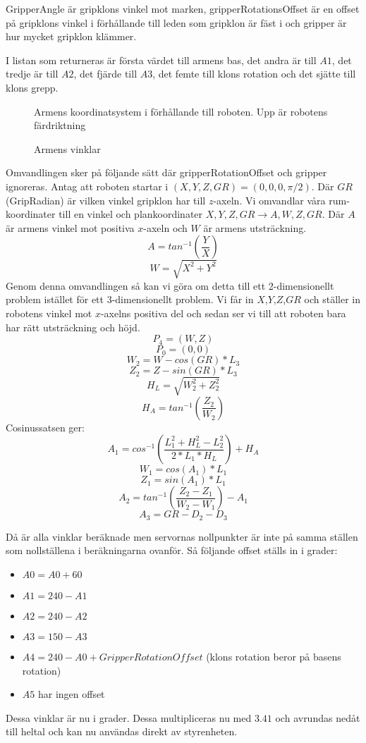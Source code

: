 GripperAngle är gripklons vinkel mot marken, gripperRotationsOffset är en offset på gripklons vinkel i förhållande till leden som gripklon är fäst i och gripper är hur mycket gripklon klämmer.

I listan som returneras är första värdet till armens bas, det andra är till $A1$, det tredje är till $A2$, det fjärde till $A3$, det femte till klons rotation och det sjätte till klons grepp.

\begin{figure}[h!]
	\centerline{}
	\caption{Armens koordinatsystem i förhållande till roboten. Upp är robotens färdriktning}
\end{figure}

\begin{figure}[h!]
	\centerline{}
	\caption{Armens vinklar}
\end{figure}

Omvandlingen sker på följande sätt där gripperRotationOffset och gripper ignoreras. Antag att roboten startar i $(X,Y,Z,GR)=(0,0,0,\pi/2)$.
Där $GR$(GripRadian) är vilken vinkel gripklon har till $z$-axeln.\newline
Vi omvandlar våra rum-koordinater till en vinkel och plankoordinater $X,Y,Z,GR\rightarrow A,W,Z,GR$. Där $A$ är armens vinkel mot positiva $x$-axeln och $W$ är armens utsträckning.
$$A=tan^{-1}(\dfrac{Y}{X}) $$
$$W=\sqrt{X^2+Y^2}$$
Genom denna omvandlingen så kan vi göra om detta till ett 2-dimensionellt problem istället för ett 3-dimensionellt problem. Vi får in $X$,$Y$,$Z$,$GR$ och ställer in robotens vinkel mot $x$-axelns positiva del och sedan ser vi till att roboten bara har rätt utsträckning och höjd.
$$P_4=(W,Z)$$
$$P_0=(0,0)$$
$$W_2=W-cos(GR)*L_3$$
$$Z_2=Z-sin(GR)*L_3$$
$$H_L=\sqrt{W_2^2+Z_2^2}$$
$$H_A=tan^{-1}(\dfrac{Z_2}{W_2})$$
Cosinussatsen ger:
$$A_1=cos^{-1}(\dfrac{L_1^2+H_L^2-L_2^2}{2*L_1*H_L})+H_A$$
$$W_1=cos(A_1)*L_1$$
$$Z_1=sin(A_1)*L_1$$
$$A_2=tan^{-1}(\dfrac{Z_2-Z_1}{W_2-W_1})-A_1$$
$$A_3=GR-D_2-D_3$$

Då är alla vinklar beräknade men servornas nollpunkter är inte på samma ställen som nollställena i beräkningarna ovanför. Så följande offset ställs in i grader:
\begin{itemize}
	\item $A0=A0+60$
	\item $A1=240-A1$
	\item $A2=240-A2$
	\item $A3=150-A3$
	\item $A4=240-A0+GripperRotationOffset$ (klons rotation beror på basens rotation)
	\item $A5$ har ingen offset
\end{itemize}
Dessa vinklar är nu i grader. Dessa multipliceras nu med $3.41$  och avrundas nedåt till heltal och kan nu användas direkt av styrenheten.

